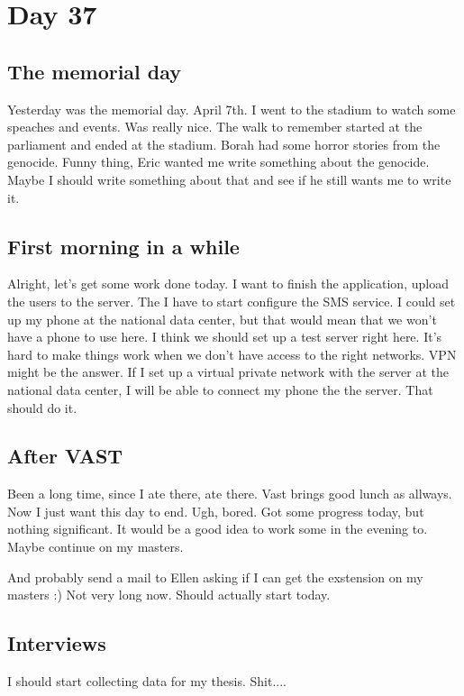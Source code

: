 \section{Day 37}
\subsection{The memorial day}
Yesterday was the memorial day. April 7th.
I went to the stadium to watch some speaches and events.
Was really nice. The walk to remember started at the parliament and ended at the stadium.
Borah had some horror stories from the genocide.
Funny thing, Eric wanted me write something about the genocide. Maybe I should write something about that and see if he still wants me to write it.
\subsection{First morning in a while}
Alright, let's get some work done today.
I want to finish the application, upload the users to the server. The I have to start configure the SMS service.
I could set up my phone at the national data center, but that would mean that we won't have a phone to use here.
I think we should set up a test server right here. 
It's hard to make things work when we don't have access to the right networks. VPN might be the answer. 
If I set up a virtual private network with the server at the national data center, I will be able to connect my phone the the server.
That should do it.
\subsection{After VAST}
Been a long time, since I ate there, ate there.
Vast brings good lunch as allways. 
Now I just want this day to end.
Ugh, bored. Got some progress today, but nothing significant.
It would be a good idea to work some in the evening to. Maybe continue on my masters. 

And probably send a mail to Ellen asking if I can get the exstension on my masters :)
Not very long now. Should actually start today.

\subsection{Interviews}
I should start collecting data for my thesis. Shit....
